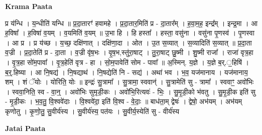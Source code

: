 \documentclass[17pt]{extarticle}
\begin{document}
\textbf{Krama Paata} \newline

प्र य॑न्धि । य॒न्धीति॑ यन्धि ॥ प्र॒दा॒तारꣳ॑ हवामहे । प्र॒दा॒तार॒मिति॑ प्र - दा॒तार᳚म् । ह॒वा॒म॒ह॒ इन्द्र᳚म् । इन्द्र॒मा । आ ह॒विषा᳚ । ह॒विषा॑ व॒यम् । व॒यमिति॑ व॒यम् ॥ उ॒भा हि । हि हस्ता᳚ । हस्ता॒ वसु॑ना । वसु॑ना पृ॒णस्व॑ । पृ॒णस्वा । आ प्र । प्र य॑च्छ । य॒च्छ॒ दक्षि॑णात् । दक्षि॑णा॒दा । ओत । उ॒त स॒व्यात् । स॒व्यादिति॑ स॒व्यात् ॥ प्र॒दा॒ता व॒ज्री । प्र॒दा॒तेति॑ प्र - दा॒ता । व॒ज्री वृ॑ष॒भः । वृ॒ष॒भ,स्तु॑रा॒षाट् । तु॒रा॒षाट् छु॒ष्मी । शु॒ष्मी राजा᳚ । राजा॑ वृत्र॒हा । वृ॒त्र॒हा सो॑म॒पावा᳚ । वृ॒त्र॒हेति॑ वृत्र - हा । सो॒म॒पावेति॑ सोम - पावा᳚ ॥ अ॒स्मिन्. य॒ज्ञे । य॒ज्ञे ब॒र्.॒॒हिषि॑ । ब॒र्॒.हिष्या । आ नि॒षद्य॑ । नि॒षद्याथ॑ । नि॒षद्येति॑ नि - सद्य॑ । अथा॑ भव । भ॒व॒ यज॑मानाय । यज॑मानाय॒ शम् । शं ॅयोः । योरिति॒ योः ॥ इन्द्रः॑ सु॒त्रामा᳚ । सु॒त्रामा॒ स्ववान्॑ । सु॒त्रामेति॑ सु - त्रामा᳚ । स्ववाꣳ॒॒ अवो॑भिः । स्ववा॒निति॒ स्व - वा॒न्॒ । अवो॑भिः सुमृडी॒कः । अवो॑भि॒रित्यवः॑ - भिः॒ । सु॒मृ॒डी॒को भ॑वतु । सु॒मृ॒डी॒क इति॑ सु - मृ॒डी॒कः । भ॒व॒तु॒ वि॒श्ववे॑दाः । वि॒श्ववे॑दा॒ इति॑ वि॒श्व - वे॒दाः॒ ॥ बाध॑ता॒म् द्वेषः॑ । द्वेषो॒ अभ॑यम् । अभ॑यम् कृणोतु । कृ॒णो॒तु॒ सु॒वीर्य॑स्य । सु॒वीर्य॑स्य॒ पत॑यः । सु॒वीर्य॒स्येति॑ सु - वीर्य॑स्य \newline

\textbf{Jatai Paata} \newline
\end{document}
